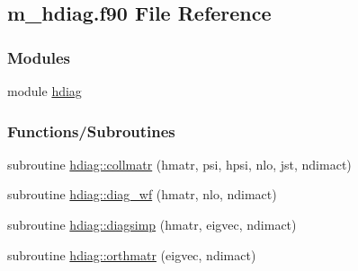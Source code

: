 \hypertarget{m__hdiag_8f90}{}\subsection{m\+\_\+hdiag.\+f90 File Reference}
\label{m__hdiag_8f90}
\subsubsection*{Modules}
\begin{DoxyCompactItemize}
\item 
module \hyperlink{namespacehdiag}{hdiag}
\end{DoxyCompactItemize}
\subsubsection*{Functions/\+Subroutines}
\begin{DoxyCompactItemize}
\item 
subroutine \hyperlink{namespacehdiag_addc0f6fc45f024942200d5d43952d826}{hdiag\+::collmatr} (hmatr, psi, hpsi, nlo, jst, ndimact)
\item 
subroutine \hyperlink{namespacehdiag_a686c74e464010b042c406ad96071fb1f}{hdiag\+::diag\+\_\+wf} (hmatr, nlo, ndimact)
\item 
subroutine \hyperlink{namespacehdiag_a3fade7324d352268d921c210b737f24c}{hdiag\+::diagsimp} (hmatr, eigvec, ndimact)
\item 
subroutine \hyperlink{namespacehdiag_acb0ddf6570d89c3fdc90e6aac52ce890}{hdiag\+::orthmatr} (eigvec, ndimact)
\end{DoxyCompactItemize}
